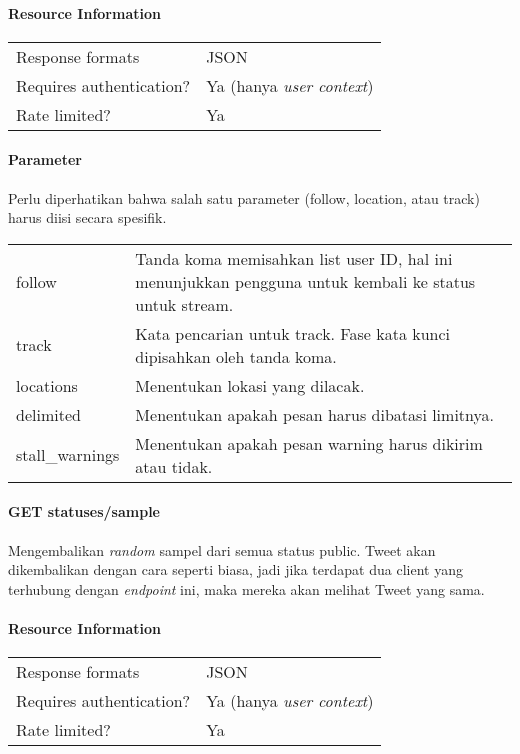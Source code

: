 \paragraph{Resource Information}
\begin{table}[h]
\begin{tabular}{|l|l|}
Response formats         & JSON                    \\
Requires authentication? & Ya (hanya \textit{user context}) \\
Rate limited?            & Ya                    
\end{tabular}
\end{table}


\paragraph{Parameter}
Perlu diperhatikan bahwa salah satu parameter (follow, location, atau track) harus diisi secara spesifik.

\begin{table}[h]
\begin{tabular}{ll}
follow          & Tanda koma memisahkan list user ID, hal ini menunjukkan pengguna untuk kembali ke status untuk stream. \\
track           & Kata pencarian untuk track. Fase kata kunci dipisahkan oleh tanda koma.                \\
locations       & Menentukan lokasi yang dilacak.                                                    \\
delimited       & Menentukan apakah pesan harus dibatasi limitnya.                                         \\
stall\_warnings & Menentukan apakah pesan warning harus dikirim atau tidak.                                         
\end{tabular}
\end{table}


\paragraph{GET statuses/sample}
Mengembalikan \textit{random} sampel dari semua status public. Tweet akan dikembalikan dengan cara seperti biasa, jadi jika terdapat dua client yang terhubung dengan \textit{endpoint} ini, maka mereka akan melihat Tweet yang sama.

\paragraph{Resource Information}
\begin{table}[h]
\begin{tabular}{|l|l|}
Response formats         & JSON                    \\
Requires authentication? & Ya (hanya \textit{user context}) \\
Rate limited?            & Ya                    
\end{tabular}
\end{table}


